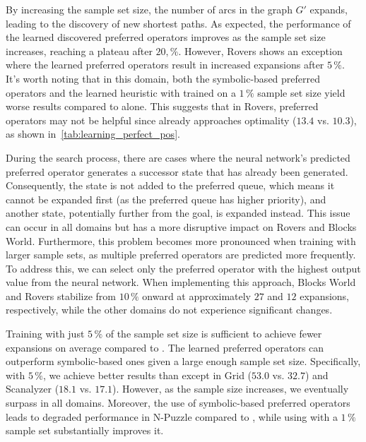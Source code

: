 \documentclass[ppgc,diss,english]{iiufrgs}
\begin{document}


By increasing the sample set size, the number of arcs in the graph $G'$ expands, leading to the discovery of new shortest paths. As expected, the performance of the learned discovered preferred operators \pog improves as the sample set size increases, reaching a plateau after $20,\%$. However, Rovers shows an exception where the learned preferred operators result in increased expansions after $5\,\%$. It's worth noting that in this domain, both the symbolic-based preferred operators \poff and the learned heuristic \hnn with \pog trained on a $1\,\%$ sample set size yield worse results compared to \hnn alone. This suggests that in Rovers, preferred operators may not be helpful since \hnn already approaches optimality ($13.4$ vs. $10.3$), as shown in~\cref{tab:learning_perfect_pos}.

During the search process, there are cases where the neural network's predicted preferred operator generates a successor state that has already been generated. Consequently, the state is not added to the preferred queue, which means it cannot be expanded first (as the preferred queue has higher priority), and another state, potentially further from the goal, is expanded instead. This issue can occur in all domains but has a more disruptive impact on Rovers and Blocks World. Furthermore, this problem becomes more pronounced when training with larger sample sets, as multiple preferred operators are predicted more frequently. To address this, we can select only the preferred operator with the highest output value from the neural network. When implementing this approach, Blocks World and Rovers stabilize from $10\,\%$ onward at approximately $27$ and $12$ expansions, respectively, while the other domains do not experience significant changes. %

Training with just $5\,\%$ of the sample set size is sufficient to achieve fewer expansions on average compared to \poff. The learned preferred operators \pog can outperform symbolic-based ones given a large enough sample set size. Specifically, with $5\,\%$, we achieve better results than \poff except in Grid ($53.0$ vs. $32.7$) and Scanalyzer ($18.1$ vs. $17.1$). However, as the sample size increases, we eventually surpass \poff in all domains. Moreover, the use of symbolic-based preferred operators \poff leads to degraded performance in N-Puzzle compared to \hnn, while using \pog with a $1\,\%$ sample set substantially improves it.
\end{document}
